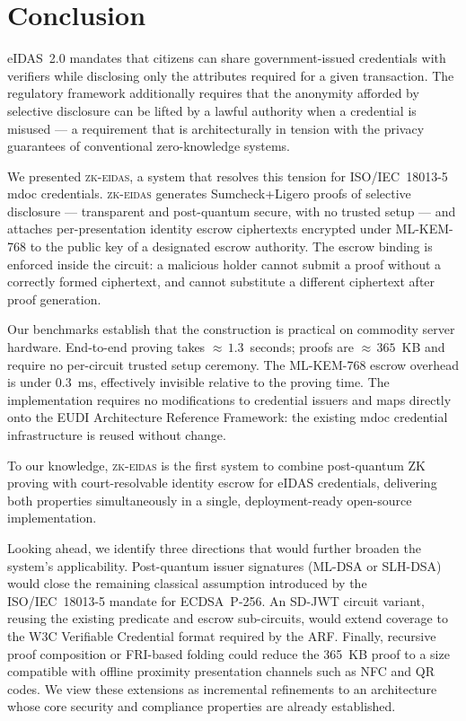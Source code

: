 \section{Conclusion}\label{sec:conclusion}

eIDAS~2.0 mandates that citizens can share government-issued credentials with verifiers
while disclosing only the attributes required for a given transaction.
The regulatory framework additionally requires that the anonymity afforded by selective
disclosure can be lifted by a lawful authority when a credential is misused --- a
requirement that is architecturally in tension with the privacy guarantees of conventional
zero-knowledge systems.

We presented \textsc{zk-eidas}, a system that resolves this tension for ISO/IEC~18013-5
mdoc credentials.
\textsc{zk-eidas} generates Sumcheck+Ligero proofs of selective disclosure --- transparent
and post-quantum secure, with no trusted setup --- and attaches per-presentation identity
escrow ciphertexts encrypted under ML-KEM-768 to the public key of a designated escrow
authority.
The escrow binding is enforced inside the circuit: a malicious holder cannot submit a
proof without a correctly formed ciphertext, and cannot substitute a different ciphertext
after proof generation.

Our benchmarks establish that the construction is practical on commodity server hardware.
End-to-end proving takes ${\approx}\,1.3$~seconds; proofs are ${\approx}\,365$~KB and
require no per-circuit trusted setup ceremony.
The ML-KEM-768 escrow overhead is under 0.3~ms, effectively invisible relative to the
proving time.
The implementation requires no modifications to credential issuers and maps directly
onto the EUDI Architecture Reference Framework: the existing mdoc credential
infrastructure is reused without change.

To our knowledge, \textsc{zk-eidas} is the first system to combine post-quantum ZK
proving with court-resolvable identity escrow for eIDAS credentials, delivering both
properties simultaneously in a single, deployment-ready open-source implementation.

Looking ahead, we identify three directions that would further broaden the system's
applicability.
Post-quantum issuer signatures (ML-DSA or SLH-DSA) would close the remaining classical
assumption introduced by the ISO/IEC~18013-5 mandate for ECDSA~P-256.
An SD-JWT circuit variant, reusing the existing predicate and escrow sub-circuits, would
extend coverage to the W3C Verifiable Credential format required by the ARF.
Finally, recursive proof composition or FRI-based folding could reduce the 365~KB proof
to a size compatible with offline proximity presentation channels such as NFC and QR
codes.
We view these extensions as incremental refinements to an architecture whose core
security and compliance properties are already established.
